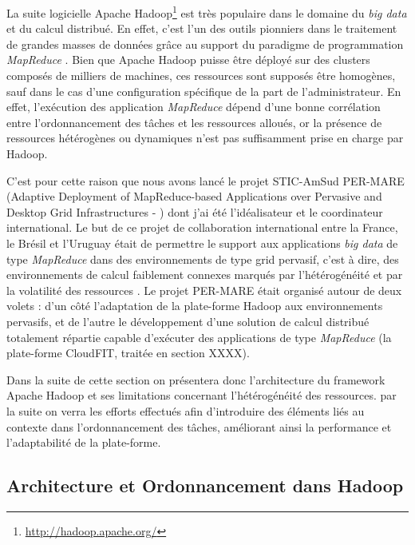 La suite logicielle Apache Hadoop\footnote{\url{http://hadoop.apache.org/}} est très populaire dans le domaine du \textit{big data} et du calcul distribué. En effet, c'est l'un des outils pionniers dans le traitement de grandes masses de données grâce au support du paradigme de programmation \textit{MapReduce} \cite{Dean2008}. Bien que Apache Hadoop puisse être déployé sur des clusters composés de milliers de machines, ces ressources sont supposés être homogènes, sauf dans le cas d'une configuration spécifique de la part de l'administrateur. En effet, l'exécution des application \textit{MapReduce} dépend d'une bonne corrélation entre l'ordonnancement des tâches et les ressources alloués, or la présence de ressources hétérogènes ou dynamiques n'est pas suffisamment prise en charge par Hadoop. 

C'est pour cette raison que nous avons lancé le projet STIC-AmSud PER-MARE (Adaptive Deployment of MapReduce-based Applications over Pervasive and Desktop Grid Infrastructures - \cite{PER-MARE}) dont j'ai été l'idéalisateur et le coordinateur international. Le but de ce projet de collaboration international entre la France, le Brésil et l'Uruguay était de permettre le support aux applications \textit{big data} de type \textit{MapReduce} dans des environnements de type grid pervasif, c'est à dire, des environnements de calcul faiblement connexes marqués par l'hétérogénéité et par la volatilité des ressources \cite{3PGCIC}. Le projet PER-MARE était organisé autour de deux volets : d'un côté l'adaptation de la plate-forme Hadoop aux environnements pervasifs, et de l'autre le développement d'une solution de calcul distribué totalement répartie capable d'exécuter des applications de type \textit{MapReduce} (la plate-forme CloudFIT, traitée en section XXXX).
 
Dans la suite de cette section on présentera donc l'architecture du framework Apache Hadoop et ses limitations concernant l'hétérogénéité des ressources. par la suite on verra les efforts effectués afin d'introduire des éléments liés au contexte dans l'ordonnancement des tâches, améliorant ainsi la performance et l'adaptabilité de la plate-forme. 



\subsection{Architecture et Ordonnancement dans Hadoop \label{subsec:ordoHadoop}}

